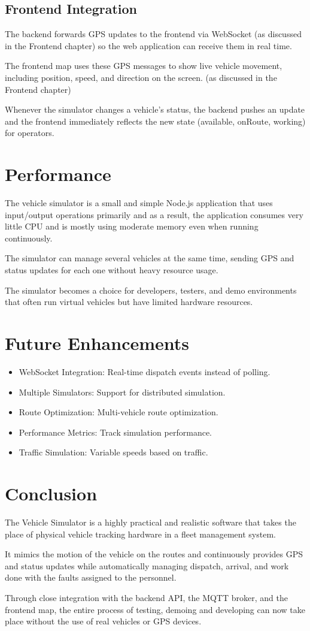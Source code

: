 \subsection{Frontend Integration}
The backend forwards GPS updates to the frontend via WebSocket (as discussed in the Frontend chapter) so the web application can receive them in real time.

The frontend map uses these GPS messages to show live vehicle movement, including position, speed, and direction on the screen. (as discussed in the Frontend chapter)

Whenever the simulator changes a vehicle’s status, the backend pushes an update and the frontend immediately reflects the new state (available, onRoute, working) for operators.

\section{Performance}
The vehicle simulator is a small and simple Node.js application that uses input/output operations primarily and as a result, the application consumes very little CPU and is mostly using moderate memory even when running continuously.

The simulator can manage several vehicles at the same time, sending GPS and status updates for each one without heavy resource usage.

The simulator becomes a choice for developers, testers, and demo environments that often run virtual vehicles but have limited hardware resources.

\section{Future Enhancements}
\begin{itemize}
    \item WebSocket Integration: Real-time dispatch events instead of polling.
    \item Multiple Simulators: Support for distributed simulation.
    \item Route Optimization: Multi-vehicle route optimization.
    \item Performance Metrics: Track simulation performance.
    \item Traffic Simulation: Variable speeds based on traffic.
\end{itemize}

\section{Conclusion}
The Vehicle Simulator is a highly practical and realistic software that takes the place of physical vehicle tracking hardware in a fleet management system.

It mimics the motion of the vehicle on the routes and continuously provides GPS and status updates while automatically managing dispatch, arrival, and work done with the faults assigned to the personnel.

Through close integration with the backend API, the MQTT broker, and the frontend map, the entire process of testing, demoing and developing can now take place without the use of real vehicles or GPS devices.

